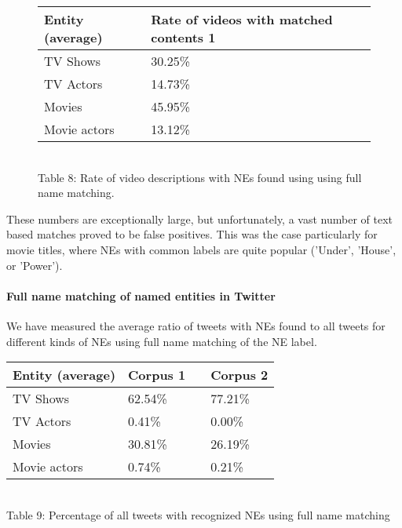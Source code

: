\begin{figure}[h!]
  \begin{center}
    \begin{tabular}{ | p{4cm} | p{6cm} | } \hline
      Entity (average) & Rate of videos with matched contents 1 \\ \hline
      TV Shows & 30.25\% \\ \hline
      TV Actors & 14.73\% \\ \hline
      Movies & 45.95\% \\ \hline
      Movie actors & 13.12\% \\ \hline
    \end{tabular} \\
    Table 8: Rate of video descriptions with NEs found using using full name matching. \\
  \end{center}
\end{figure}

These numbers are exceptionally large, but unfortunately, a vast number of text
based matches proved to be false positives. This was the case particularly for
movie titles, where NEs with common labels are quite popular (\eg 'Under',
'House', or 'Power').

\paragraph{Full name matching of named entities in Twitter}
We have measured the average ratio of tweets with NEs found to all tweets for different kinds of NEs
using full name matching of the NE label.

\begin{center}
  \begin{tabular}{ | p{4cm} | p{2cm} | p{1cm}| p{2cm} | } \hline
    Entity (average) & Corpus 1 & & Corpus 2 \\ \hline
    TV Shows & 62.54\% & & 77.21\% \\ \hline
    TV Actors & 0.41\% & & 0.00\% \\ \hline
    Movies & 30.81\% & & 26.19\% \\ \hline
    Movie actors & 0.74\% & & 0.21\% \\ \hline
  \end{tabular} \\
  Table 9: Percentage of all tweets with recognized NEs using full name matching \\
\end{center}

